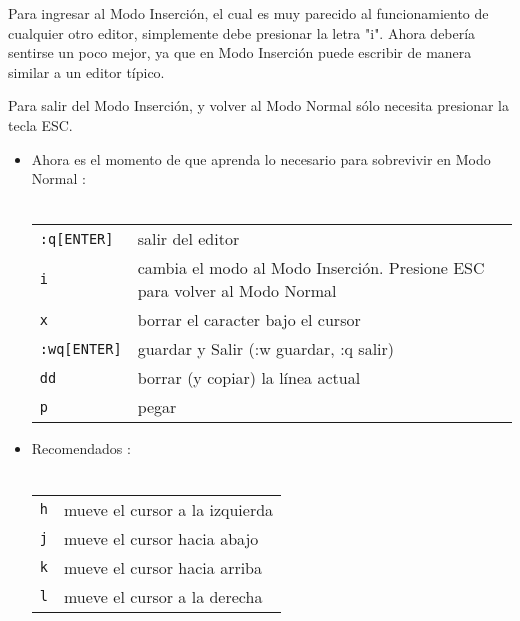 \documentclass[12pt]{article}
\def\ti#1#2{\texttt{#1} & #2 \\ }
\begin{document}
Para ingresar al Modo Inserción, el cual es muy parecido al funcionamiento
de cualquier otro editor, simplemente debe presionar la letra "i".
Ahora debería sentirse un poco mejor, ya que en Modo Inserción puede
escribir de manera similar a un editor típico.

Para salir del Modo Inserción, y volver al Modo Normal sólo necesita
presionar la tecla ESC.



\begin{itemize}
	\item Ahora es el momento de que aprenda lo necesario para sobrevivir
en Modo Normal : \\ \\
\begin{tabular}{ l l l }
	\ti{:q[ENTER]}{salir del editor}
	\texttt{i} &  cambia el modo al Modo Inserción. Presione ESC para volver al Modo Normal \\
	\texttt{x} &  borrar el caracter bajo el cursor \\
	\texttt{:wq[ENTER]} & guardar y Salir (:w guardar, :q salir) \\
	\texttt{dd} &  borrar (y copiar) la línea actual \\
	\texttt{p} &  pegar \\
\end{tabular}
\end{itemize}

	

\begin{itemize}
	\item Recomendados : \\ \\
\begin{tabular}{ l l }
	\texttt{h} & mueve el cursor a la izquierda \\
	\texttt{j} & mueve el cursor hacia abajo \\
	\texttt{k} & mueve el cursor hacia arriba \\
	\texttt{l} & mueve el cursor a la derecha \\
\end{tabular}
\end{itemize}
\end{document}
